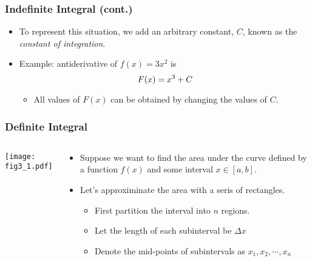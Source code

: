 \documentclass[pdflatex, 12pt]{beamer}
\begin{document}
\begin{frame}
\frametitle{Indefinite Integral (cont.)}
\begin{itemize}
\item To represent this situation, we add an arbitrary constant, $C$, known as the \emph{constant of integration}.
\vspace{0.4cm}
\item Example: antiderivative of $f(x) = 3x^2$ is 
 \begin{equation}
 F(x) = x^3 + C \notag
 \end{equation}
 \begin{itemize}
 \item All values of $F(x)$ can be obtained by changing the values of $C$.
 \end{itemize}
\end{itemize}	
\end{frame}

\begin{frame}
\frametitle{Definite Integral}
\begin{columns}
\begin{column}{0.5\textwidth}
\texttt{[image: fig3\_1.pdf]}
\end{column}
\begin{column}{0.5\textwidth}
\begin{itemize}
\item Suppose we want to find the area under the curve defined by a function $f(x)$ and some interval $x \in [a, b]$.
\vspace{0.4cm}
\item Let's approximinate the area with a seris of rectangles.
 \begin{itemize}
 \item First partition the interval into $n$ regions.
 \item Let the length of each subinterval be $\Delta x$
 \item Denote the mid-points of subintervals as $x_1, x_2, \cdots, x_n$ 
 \end{itemize}
\end{itemize}
\end{column}
\end{columns}
\end{frame}
\end{document}
